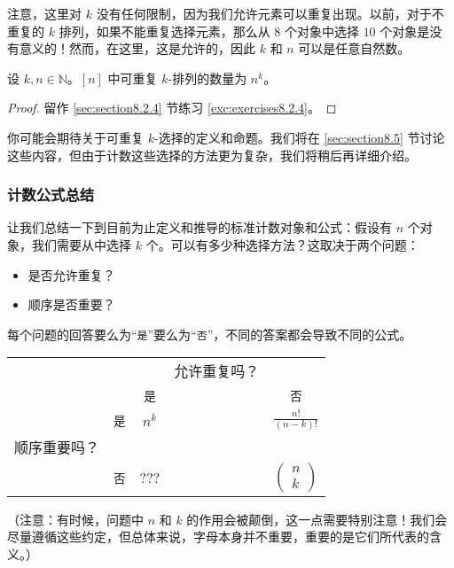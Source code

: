 注意，这里对 $k$ 没有任何限制，因为我们允许元素可以重复出现。以前，对于不重复的 $k$ 排列，如果不能重复选择元素，那么从 $8$ 个对象中选择 $10$ 个对象是没有意义的！然而，在这里，这是允许的，因此 $k$ 和 $n$ 可以是任意自然数。

\begin{proposition}\label{prop:proposition8.2.21}
    设 $k, n \in \mathbb{N}$。$[n]$ 中可重复 $k$-排列的数量为 $n^k$。
\end{proposition}

\begin{proof}
    留作 \ref{sec:section8.2.4} 节练习 \ref{exc:exercises8.2.4}。
\end{proof}

你可能会期待关于可重复 $k$-选择的定义和命题。我们将在 \ref{sec:section8.5} 节讨论这些内容，但由于计数这些选择的方法更为复杂，我们将稍后再详细介绍。

\subsubsection*{计数公式总结}

让我们总结一下到目前为止定义和推导的标准计数对象和公式：假设有 $n$ 个对象，我们需要从中选择 $k$ 个。可以有多少种选择方法？这取决于两个问题：
\begin{itemize}
    \item 是否允许重复？
    \item 顺序是否重要？
\end{itemize}
每个问题的回答要么为``\verb|是|''要么为``\verb|否|''，不同的答案都会导致不同的公式。
\begin{center}
    \begin{tabular}{lcccc}
               &          &          & 允许重复吗？ &                                       \\
               &          & \verb|是| &        & \verb|否|                              \\
               & \verb|是| & $n^k$    &        & $\displaystyle \frac{n!}{(n-k)!}$     \\
        顺序重要吗？ &          &          &        &                                       \\
               & \verb|否| & ???      &        & $\begin{pmatrix}
                                                                               n \\
                                                                               k
                                                                           \end{pmatrix}$
    \end{tabular}
\end{center}
（注意：有时候，问题中 $n$ 和 $k$ 的作用会被颠倒，这一点需要特别注意！我们会尽量遵循这些约定，但总体来说，字母本身并不重要，重要的是它们所代表的含义。）


